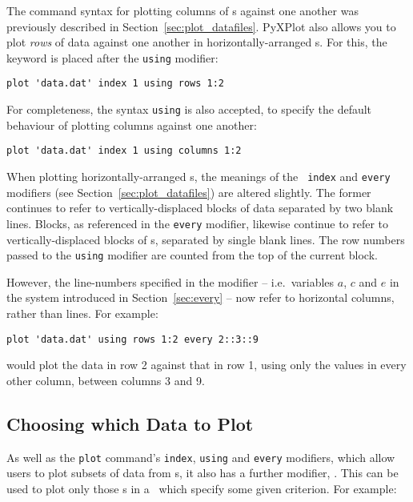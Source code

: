 \label{sec:horizontal_datafiles} The command syntax for plotting
columns of \datafile s against one another was previously described in
Section~\ref{sec:plot_datafiles}. PyXPlot also allows you to plot {\it rows} of
data against one another in horizontally-arranged \datafile s.  For this, the
keyword  is placed after the {\tt using} modifier:

\begin{verbatim}
plot 'data.dat' index 1 using rows 1:2
\end{verbatim}

\noindent For completeness, the syntax {\tt using}  is also
accepted, to specify the default behaviour of plotting columns against one
another:

\begin{verbatim}
plot 'data.dat' index 1 using columns 1:2
\end{verbatim}

When plotting horizontally-arranged \datafile s, the meanings of the {\tt
index} and {\tt every} modifiers (see Section~\ref{sec:plot_datafiles}) are
altered slightly. The former continues to refer to vertically-displaced blocks
of data separated by two blank lines.  Blocks, as referenced in the {\tt every}
modifier, likewise continue to refer to vertically-displaced blocks of
\datapoint s, separated by single blank lines. The row numbers passed to the
{\tt using} modifier are counted from the top of the current block.

However, the line-numbers specified in the  modifier -- i.e.\
variables $a$, $c$ and $e$ in the system introduced in Section~\ref{sec:every}
-- now refer to horizontal columns, rather than lines. For example:

\begin{verbatim}
plot 'data.dat' using rows 1:2 every 2::3::9
\end{verbatim}

\noindent would plot the data in row 2 against that in row 1, using only the
values in every other column, between columns 3 and 9.

\subsection{Choosing which Data to Plot}
\label{sec:select_modifier} 
As well as the {\tt plot} command's {\tt index}, {\tt using} and {\tt every}
modifiers, which allow users to plot subsets of data from \datafile s, it also
has a further modifier, \indmodt{select}. This can be used to plot only those
\datapoint s in a \datafile\ which specify some given criterion. For example:

